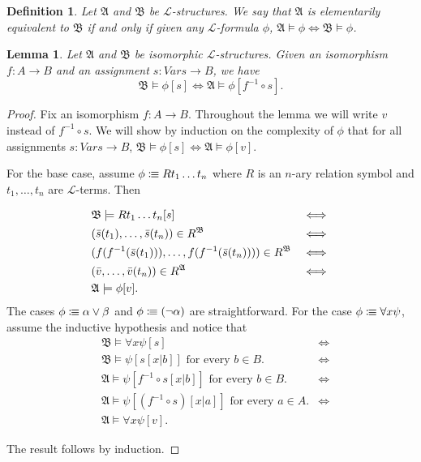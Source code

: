 \documentclass[leqno]{article}
\newtheorem{lemma}{Lemma}[section]
\newtheorem{definition}{Definition}[section]
\newcommand{\lang}{\mathcal{L}}
\newcommand{\is}{\colonequiv}
\newcommand{\struct}[1]{\mathfrak{#1}}
\begin{document}
\begin{definition}\label{def_equivalentStructures}
  Let $\struct{A}$ and $\struct{B}$ be $\lang$-structures. We say that $\struct{A}$ is elementarily equivalent to $\struct{B}$ if and only if given any $\lang$-formula $\phi$, $\struct{A} \models \phi \iff \struct{B} \models \phi$.
\end{definition}

\begin{lemma} \label{lem_isoEquiv}
    Let $\struct{A}$ and $\struct{B}$ be isomorphic $\lang$-structures. Given an isomorphism $f: A \to B$ and an assignment $s: Vars \to B$, we have $$\struct{B} \models \phi [s] \iff \struct{A} \models \phi[f^{-1} \circ s].$$
\end{lemma}

\begin{proof}
   Fix an isomorphism $f: A \to B$. Throughout the lemma we will write $v$ instead of $f^{-1} \circ s$. We will show by induction on the complexity of $\phi$ that for all assignments $s: Vars \to B$, $\struct{B} \models \phi[s] \iff \struct{A} \models \phi[v]$.
   
   For the base case, assume $\phi \is R t_1 \dots t_n$ where $R$ is an $n$-ary relation symbol and $t_1, \dots, t_n$ are $\lang$-terms. Then 
   
   \begin{align*}
       &\struct{B} \models R t_1 \dots t_n[s] &\iff \\ 
       &(\Bar{s}(t_1), \dots, \Bar{s}(t_n)) \in R^\struct{B} &\iff \\
       &(f(f^{-1}(\Bar{s}(t_1))), \dots, f(f^{-1}(\Bar{s}(t_n)))) \in R^\struct{B} &\iff \\
       &(\Bar{v}, \dots, \Bar{v}(t_n)) \in R^\struct{A} &\iff \\
       &\struct{A} \models \phi[v].
   \end{align*}
   The cases $\phi \is \alpha \lor \beta$ and $\phi \is (\neg \alpha)$ are straightforward. For the case $\phi \is \forall x \psi$, assume the inductive hypothesis and notice that 
   \begin{align*}
       &\struct{B} \models \forall x \psi[s] &\iff \\
       &\struct{B} \models \psi [s[x|b]] \text{ for every $b \in B$.} &\iff \\
       &\struct{A} \models \psi[f^{-1} \circ s[x|b]] \text{ for every $b \in B$.} &\iff \\
       &\struct{A} \models \psi[(f^{-1} \circ s)[x|a]] \text{ for every $a \in A$.} &\iff \\
       &\struct{A} \models \forall x \psi[v].
   \end{align*} 
   
   The result follows by induction.

\end{proof}
\end{document}
